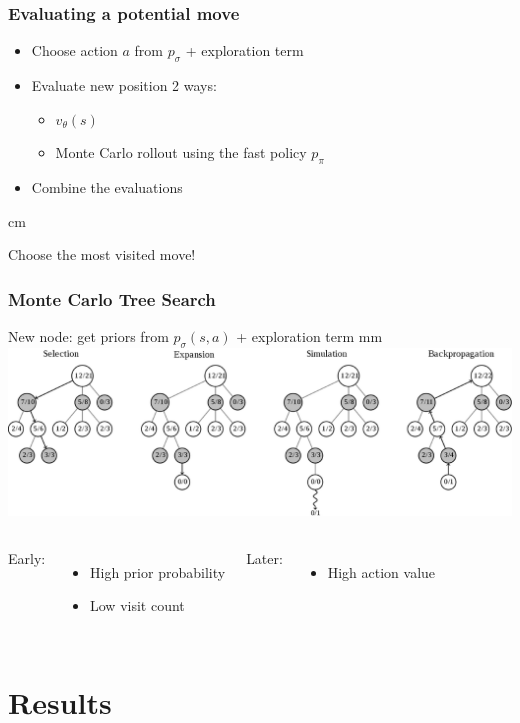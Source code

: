 \documentclass{beamer}
\begin{document}
\begin{frame}
  \frametitle{Evaluating a potential move}
  \begin{itemize}
  \item Choose action $a$ from $p_\sigma$ + exploration term
  \item Evaluate new position 2 ways:
    \begin{itemize}
    \item $v_\theta(s)$
    \item Monte Carlo rollout using the fast policy $p_\pi$
    \end{itemize}
    \item Combine the evaluations
  \end{itemize}
   cm
  \begin{tcolorbox}
    \begin{center}
      Choose the most visited move!
    \end{center}
  \end{tcolorbox}
\end{frame}


\begin{frame}
  \frametitle{Monte Carlo Tree Search}
  New node: get priors from $p_\sigma(s,a)$ + exploration term
   mm
  \includegraphics[width=\textwidth]{MCTS}
  \begin{columns}
    Early:
    \begin{itemize}
    \item High prior probability
    \item Low visit count
    \end{itemize}
    Later:
    \begin{itemize}
    \item High action value
    \end{itemize}
  \end{columns}
\end{frame}

\section{Results}
\end{document}
